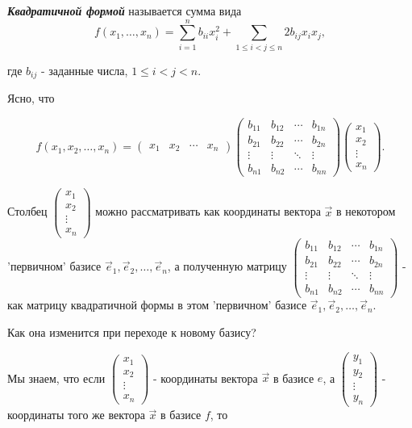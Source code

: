 \begin{definition}
    \textbf{\textit{Квадратичной формой}} называется сумма вида $$f(x_1, \ldots, x_n) = \sum_{i=1}^n b_{ii}x_i^2 + \sum_{1 \leq i < j \leq n} 2b_{ij}x_ix_j,$$

    где $b_{ij}$ - заданные числа, $1 \leq i < j < n$.
\end{definition}

Ясно, что

$$
f(x_1, x_2, \ldots, x_n) = 
\begin{pmatrix}
x_1 & x_2 & \cdots & x_n
\end{pmatrix}
\begin{pmatrix}
    b_{11} & b_{12} & \cdots & b_{1n} \\
    b_{21} & b_{22} & \cdots & b_{2n} \\
    \vdots & \vdots & \ddots & \vdots \\
    b_{n1} & b_{n2} & \cdots & b_{nn}
\end{pmatrix}
\begin{pmatrix}
    x_1 \\
    x_2 \\
    \vdots \\
    x_n
\end{pmatrix}.
$$

Столбец $\begin{pmatrix}
    x_1 \\
    x_2 \\
    \vdots \\
    x_n
\end{pmatrix}$ можно рассматривать как координаты вектора $\vec{x}$ в некотором 'первичном' базисе $\vec{e}_1, \vec{e}_2, \ldots, \vec{e}_n$, а полученную матрицу $\begin{pmatrix}
    b_{11} & b_{12} & \cdots & b_{1n} \\
    b_{21} & b_{22} & \cdots & b_{2n} \\
    \vdots & \vdots & \ddots & \vdots \\
    b_{n1} & b_{n2} & \cdots & b_{nn}
\end{pmatrix}$ - как матрицу квадратичной формы в этом 'первичном' базисе $\vec{e}_1, \vec{e}_2, \ldots, \vec{e}_n$. 

Как она изменится при переходе к новому базису?

Мы знаем, что если $\begin{pmatrix}
    x_1 \\
    x_2 \\
    \vdots \\
    x_n
\end{pmatrix}$ - координаты вектора $\vec{x}$ в базисе $e$, а $\begin{pmatrix}
    y_1 \\
    y_2 \\
    \vdots \\
    y_n
\end{pmatrix}$ - координаты того же вектора $\vec{x}$ в базисе $f$, то

